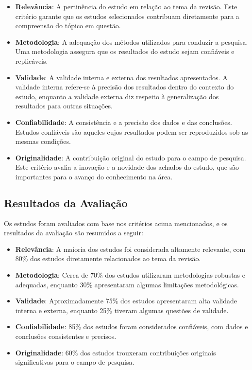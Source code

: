 \documentclass[conference]{IEEEtran}
\begin{document}
\begin{itemize}
    \item \textbf{Relevância}: A pertinência do estudo em relação ao tema da revisão. Este critério garante que os estudos selecionados contribuam diretamente para a compreensão do tópico em questão.
    \item \textbf{Metodologia}: A adequação dos métodos utilizados para conduzir a pesquisa. Uma metodologia assegura que os resultados do estudo sejam confiáveis e replicáveis.
    \item \textbf{Validade}: A validade interna e externa dos resultados apresentados. A validade interna refere-se à precisão dos resultados dentro do contexto do estudo, enquanto a validade externa diz respeito à generalização dos resultados para outras situações.
    \item \textbf{Confiabilidade}: A consistência e a precisão dos dados e das conclusões. Estudos confiáveis são aqueles cujos resultados podem ser reproduzidos sob as mesmas condições.
    \item \textbf{Originalidade}: A contribuição original do estudo para o campo de pesquisa. Este critério avalia a inovação e a novidade dos achados do estudo, que são importantes para o avanço do conhecimento na área.
\end{itemize}

\subsection{Resultados da Avaliação}

Os estudos foram avaliados com base nos critérios acima mencionados, e os resultados da avaliação são resumidos a seguir:

\begin{itemize}
    \item \textbf{Relevância}: A maioria dos estudos foi considerada altamente relevante, com 80\% dos estudos diretamente relacionados ao tema da revisão.
    \item \textbf{Metodologia}: Cerca de 70\% dos estudos utilizaram metodologias robustas e adequadas, enquanto 30\% apresentaram algumas limitações metodológicas.
    \item \textbf{Validade}: Aproximadamente 75\% dos estudos apresentaram alta validade interna e externa, enquanto 25\% tiveram algumas questões de validade.
    \item \textbf{Confiabilidade}: 85\% dos estudos foram considerados confiáveis, com dados e conclusões consistentes e precisos.
    \item \textbf{Originalidade}: 60\% dos estudos trouxeram contribuições originais significativas para o campo de pesquisa.
\end{itemize}
\end{document}
